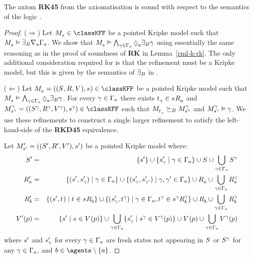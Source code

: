 \begin{lemma}\label{rml-k45-rk45}
The axiom {\bf RK45} from the axiomatisation \axiomRmlKFF{} is sound with respect to the semantics of the logic \logicRmlKFF{}.
\end{lemma}

\begin{proof}
($\Rightarrow$) Let $\kPModel{\kStateS} \in \classKFF$ be a pointed Kripke model such that $\kPModel{\kStateS} \entails \somerefsBs \coversA \Gamma_\agentA$.
We show that $\kPModel{\kStateS} \entails \bigwedge_{\gamma \in \Gamma_\agentA} \possibleA \somerefsBs \gamma$ using essentially the same reasoning as in the proof of soundness of {\bf RK} in Lemma~\ref{rml-k-rk}.
The only additional consideration required for \logicRmlKFF{} is that the refinement must be a \classKFF{} Kripke model, but this is given by the semantics of $\somerefsBs$ in \logicRmlKFF{}.

($\Leftarrow$) Let $\kPModelAndTuple{\kStateS} \in \classKFF$ be a pointed Kripke model such that $\kPModel{\kStateS} \entails \bigwedge_{\gamma \in \Gamma_\agentA} \possibleA \somerefsBs \gamma$.
For every $\gamma \in \Gamma_\agentA$ there exists $\kStateT_\gamma \in \kSuccessorsA{\kStateS}$ and $\kPModelAndTuple[\gamma]{\kStateS[\gamma]} \in \classKFF$ such that $\kPModel{\kStateT_\gamma} \simulatesBs \kPModel[\gamma]{\kStateS[\gamma]}$ and $\kPModel[\gamma]{\kStateS[\gamma]} \entails \gamma$.
We use these refinements to construct a single larger refinement to satisfy the left-hand-side of the {\bf RKD45} equivalence.

Let $\kPModelAndTupleP{\kStateSP}$ be a pointed Kripke model where:
\begin{eqnarray*}
    \kStatesP &=& \{\kStateSP\} \cup \{\kStateSP_\gamma \mid \gamma \in \Gamma_\agentA\} \cup \kStates \cup \bigcup_{\gamma \in \Gamma_\agentA} \kStates[\gamma]\\
    \kAccessibilityPA &=& \{(\kStateSP, \kStateSP_\gamma) \mid \gamma \in \Gamma_\agentA\} \cup \{(\kStateSP_\gamma, \kStateSP_{\gamma'}) \mid \gamma, \gamma' \in \Gamma_\agentA\} \cup \kAccessibilityA \cup \bigcup_{\gamma \in \Gamma_\agentA} \kAccessibilityA[\gamma]\\
    \kAccessibilityPB &=& \{(\kStateSP, \kStateT) \mid \kStateT \in \kSuccessorsB{\kStateS}\} \cup \{(\kStateSP_\gamma, \kStateT[\gamma]) \mid \gamma \in \Gamma_\agentA, \kStateT[\gamma] \in \kSuccessorsB[\gamma]{\kStateS[\gamma]}\} \cup \kAccessibilityB \cup \bigcup_{\gamma \in \Gamma_\agentA} \kAccessibilityB[\gamma]\\
    \kValuationP(\atomP) &=& \{\kStateSP \mid \kStateS \in \kValuation(\atomP)\} \cup \bigcup_{\gamma \in \Gamma_\agentA} \{\kStateSP_\gamma \mid \kStateS[\gamma] \in \kValuation[\gamma](\atomP)\} \cup \kValuation(\atomP) \cup \bigcup_{\gamma \in \Gamma_\agentA} \kValuation[\gamma](\atomP)
\end{eqnarray*}
where $\kStateSP$ and $\kStateSP_\gamma$ for every $\gamma \in \Gamma_\agentA$ are fresh states not appearing in $\kStates$ or $\kStates[\gamma]$ for any $\gamma \in \Gamma_\agentA$, and $\agentB \in \agents \setminus \{\agentA\}$.


\end{proof}
